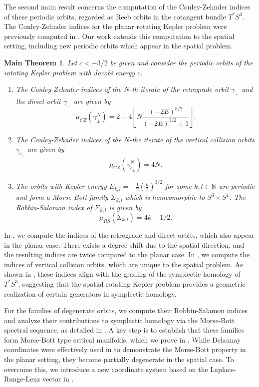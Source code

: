 \documentclass{amsart}
\newcommand{\N}{\mathbb{N}}
\newcommand{\g}{\gamma}
\newtheorem{mainthm}{Main Theorem}
\begin{document}
The second main result concerns the computation of the Conley-Zehnder indices of these periodic orbits, regarded as Reeb orbits in the cotangent bundle $T^*S^3$. The Conley-Zehnder indices for the planar rotating Kepler problem were previously computed in \cite{Albers_Fish_Frauenfelder_vanKoert_13}. Our work extends this computation to the spatial setting, including new periodic orbits which appear in the spatial problem.
\begin{mainthm}
		Let $c<-3/2$ be given and consider the periodic orbits of the rotating Kepler problem with Jacobi energy $c$.
	\begin{enumerate}
		\item The Conley-Zehnder indices of the $N$-th iterate of the retrograde orbit $\g_+$ and the direct orbit $\g_-$ are given by
			$$
			\mu_{CZ}(\g_\pm^N)=2+4\left\lfloor N\frac{(-2E)^{3/2}}{(-2E)^{3/2}\pm1}\right\rfloor.
			$$
		\item The Conley-Zehnder indices of the $N$-the iterate of the vertical collision orbits $\g_{c_\pm}$ are given by
			$$
			\mu_{CZ}(\g_{c_\pm}^N)=4N.
			$$
		\item The orbits with Kepler energy $E_{k,l}=-\frac{1}{2}\left(\frac{k}{l}\right)^{3/2}$ for some $k,l\in\N$ are periodic and form a Morse-Bott family $\Sigma_{k,l}$ which is homeomorphic to $S^3\times S^1$.
		The Robbin-Salamon index of $\Sigma_{k,l}$ is given by
			$$
			\mu_{RS}(\Sigma_{k,l})=4k-1/2.
			$$
	\end{enumerate}
\end{mainthm}
In , we compute the indices of the retrograde and direct orbits, which also appear in the planar case.
There exists a degree shift due to the spatial direction, and the resulting indices are twice compared to the planar case.
In , we compute the indices of vertical collision orbits, which are unique to the spatial problem. As shown in , these indices align with the grading of the symplectic homology of $T^*S^3$, suggesting that the spatial rotating Kepler problem provides a geometric realization of certain generators in symplectic homology.

For the families of degenerate orbits, we compute their Robbin-Salamon indices and analyze their contributions to symplectic homology via the Morse-Bott spectral sequence, as detailed in . A key step is to establish that these families form Morse-Bott type critical manifolds, which we prove in . While Delaunay coordinates were effectively used in \cite{Albers_Fish_Frauenfelder_vanKoert_13} to demonstrate the Morse-Bott property in the planar setting, they become partially degenerate in the spatial case. To overcome this, we introduce a new coordinate system based on the Laplace-Runge-Lenz vector in .
\end{document}
